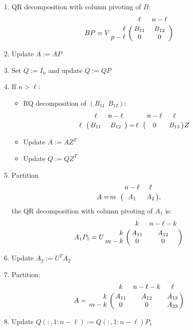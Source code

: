 \begin{enumerate}[{\rm Step 1}(1)]
\item QR decomposition with column pivoting of $B$:
\begin{equation} \label{alg-step-1-1}
    BP = V\bordermatrix{ & \ell & n-\ell \cr
    \hfill \ell & B_{11} & B_{12} \cr
    \hfill p-\ell & 0 & 0 \cr}
\end{equation}

\item Update $A := AP$
\item Set $Q := I_n$ and update $Q := QP$

\item If $n > \ell$:
\begin{itemize}
\item RQ decomposition of $(B_{11} \ \ B_{12})$:
\begin{equation} \label{alg-step-1-4}
   \bordermatrix{ & \ell & n-\ell \cr
    \hfill \ell & B_{11} & B_{12} \cr}
    = \bordermatrix{ & n-\ell & \ell \cr
    \hfill \ell & 0 & B_{13} \cr}Z
\end{equation}

\item Update $A := AZ^{T}$
\item Update $Q := QZ^{T}$
\end{itemize}

\item Partition
\begin{equation} \label{alg-step-1-5a}
    A = \bordermatrix{ & n-\ell & \ell \cr
    \hfill m & A_{1} & A_{2} \cr},
\end{equation}
the QR decomposition with column pivoting of $A_1$ is:
\begin{equation} \label{alg-step-1-5b}
    A_{1}P_{1} = 
    U\bordermatrix{ & k & n-\ell-k \cr
    \hfill k & A_{11} & A_{12} \cr
    \hfill m-k & 0 & 0 \cr}
\end{equation}
\item Update $A_{2} := U^{T}A_{2}$ 

\item Partition:
\begin{equation} \label{alg-step-1-7} 
    A = \bordermatrix{ 
               & k & n-\ell-k & \ell \cr
    \hfill k   & A_{11} & A_{12} & A_{13} \cr
    \hfill m-k & 0      & 0      & A_{23} \cr}
\end{equation}

\item Update $Q(:, 1:n-\ell) := Q(:, 1:n-\ell)P_{1}$


\end{enumerate}
